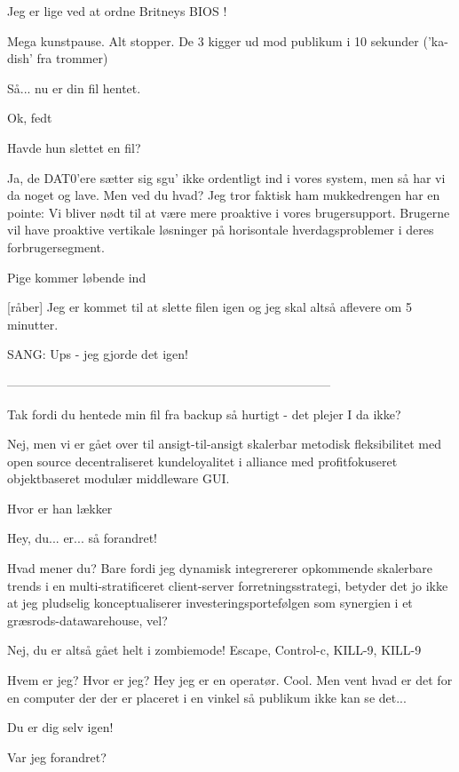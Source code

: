 \documentclass[danish]{article}
\begin{document}
\begin{sketch}
 Jeg er lige ved at ordne Britneys BIOS !

\scene Mega kunstpause. Alt stopper. De 3 kigger ud mod publikum i 10
sekunder ('ka-dish' fra trommer)

 Så... nu er din fil hentet.

 Ok, fedt 

 Havde hun slettet en fil?

 Ja, de DAT0'ere sætter sig sgu' ikke ordentligt ind i vores system,
men så har vi da noget og lave. Men ved du hvad? Jeg tror faktisk ham
mukkedrengen har en pointe: Vi bliver nødt til at være mere proaktive i vores
brugersupport. Brugerne vil have proaktive vertikale løsninger på horisontale
hverdagsproblemer i deres forbrugersegment.

\scene Pige kommer løbende ind

[råber] Jeg er kommet til at slette filen igen og jeg skal altså
aflevere om 5 minutter.

\scene SANG: Ups - jeg gjorde det igen!

\scene ------------------------------------------------------------------------------

 Tak fordi du hentede min fil fra backup så hurtigt - det plejer I
da ikke?

 Nej, men vi er gået over til ansigt-til-ansigt skalerbar metodisk
fleksibilitet med open source decentraliseret kundeloyalitet i alliance med
profitfokuseret objektbaseret modulær middleware GUI.

 Hvor er han lækker 

 Hey, du... er... så forandret!

 Hvad mener du? Bare fordi jeg dynamisk integrererer opkommende
skalerbare trends i en multi-stratificeret client-server forretningsstrategi,
betyder det jo ikke at jeg pludselig konceptualiserer investeringsportefølgen
som synergien i et græsrods-datawarehouse, vel?

 Nej, du er altså gået helt i zombiemode! Escape, Control-c, KILL-9,
KILL-9 

 Hvem er jeg? Hvor er jeg? Hey jeg er en operatør. Cool. Men vent
hvad er det for en computer der der er placeret i en vinkel så publikum ikke kan
se det...

 Du er dig selv igen!

 Var jeg forandret?


\end{sketch}
\end{document}
